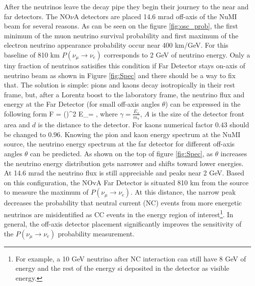 After the neutrinos leave the decay pipe they begin their journey to the near and far detectors.
The NO$\nu$A detectors are placed 14.6 mrad off-axis of the NuMI beam for several reasons. As can
be seen on the figure \ref{fig:osc_prob}, the first minimum of the muon neutrino survival
probability and first maximum of the electron neutrino appearance probability occur near 400 km/GeV. 
For this baseline of 810 km $P(\nu_\mu \rightarrow \nu_e)$ corresponds
to 2 GeV of neutrino energy. Only a tiny fraction of neutrinos satisifies this condition if Far Detector 
stays on-axis of neutrino beam as shown in Figure \ref{fig:Spec} and 
there should be a way to fix that. The solution is simple: pions and kaons decay isotropically in their 
rest frame, but, after a Lorentz boost to the laboratory frame, the neutrino flux and energy at the Far 
Detector (for small off-axis angles $\theta$) can be expressed in the following form
\be
F = \Big(\Big)^2
\ee
\be
E_\nu = ,\label{EnuvsEpi}
\ee
where $\gamma = \frac{E_\pi}{m_\pi}$, $A$ is the size of the detector front area and $d$ is 
the distance to the detector. For kaons numerical factor $0.43$ should be changed to $0.96$. 
Knowing the pion and kaon energy spectrum at the NuMI source, the neutrino energy spectrum at
the far detector for different off-axis angles $\theta$ can be predicted. As shown on the top of
figure \ref{fig:Spec}, as $\theta$ increases the neutrino energy distribution gets narrower and shifts
toward lower energies. At 14.6 mrad the neutrino flux is still appreciable and peaks near 2 GeV.
Based on this configuration, the NOvA Far Detector is situated 810 km from the source to measure
the maximum of $P(\nu_\mu \rightarrow \nu_e)$. At this distance, the narrow peak decreases the
probability that neutral current (NC) events from more energetic neutrinos are misidentified
as CC events in the energy region of interest\footnote{For example, a 10 GeV neutrino after NC interaction
can still have 8 GeV of energy and the rest of the energy si deposited in the detector as visible energy.}. 
In general, the off-axis detector placement significantly improves the sensitivity of the 
$P(\nu_\mu \rightarrow \nu_e)$ probability measurement.
